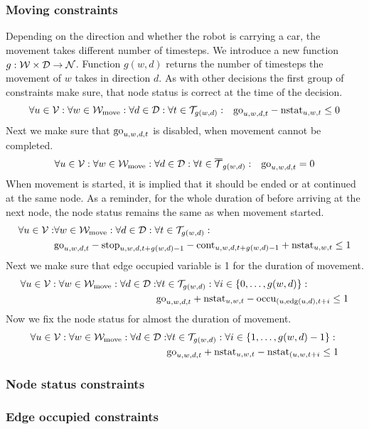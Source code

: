 \subsubsection{Moving constraints}
Depending on the direction and whether the robot is carrying a car, the
movement takes different number of timesteps. We introduce a new function $g:
\mathcal{W} \times \mathcal{D} \to \mathcal{N}$. Function $g(w,d)$ returns the number of timesteps
the movement of $w$ takes in direction $d$. As with other decisions the first
group of constraints make sure, that node status is correct at the time of the
decision.
\begin{align}
    &\forall u \in \mathcal{V}: \forall w \in \mathcal{W}_\mathrm{move}: \forall d \in \mathcal{D}: \forall t \in
    \mathcal{T}_{g(w,d)}:
    & \mathrm{go}_{u,w,d,t} - \mathrm{nstat}_{u,w,t} \leq 0
\end{align}
Next we make sure that $\mathrm{go}_{u,w,d,t}$ is disabled, when movement cannot be
completed.
\begin{align}
    &\forall u \in \mathcal{V}: \forall w \in \mathcal{W}_\mathrm{move}: \forall d \in \mathcal{D}: \forall t \in
    \overline{\mathcal{T}}_{g(w,d)}:
    & \mathrm{go}_{u,w,d,t} = 0
\end{align}
When movement is started, it is implied that it should be ended or at continued
at the same node. As a reminder, for the whole duration of before arriving at
the next node, the node status remains the same as when movement started.
\begin{equation}
    \begin{split}
        \forall u \in \mathcal{V}: &\forall w \in \mathcal{W}_\mathrm{move}: \forall d \in \mathcal{D}: \forall t \in
        \mathcal{T}_{g(w,d)}:\\
        & \mathrm{go}_{u,w,d,t} - \mathrm{stop}_{u,w,d,t+g(w,d)-1} - \mathrm{cont}_{u,w,d,t+g(w,d)-1} +
        \mathrm{nstat}_{u,w,t} \leq 1
    \end{split}
\end{equation}
Next we make sure that edge occupied variable is 1 for the duration of
movement.
\begin{equation}
    \begin{split}
        \forall u \in \mathcal{V}: \forall w \in \mathcal{W}_\mathrm{move}: \forall d \in \mathcal{D}: &\forall t \in
        \mathcal{T}_{g(w,d)}: \forall i \in \{0,\ldots,g(w,d)\}:\\
        & \mathrm{go}_{u,w,d,t} + \mathrm{nstat}_{u,w,t} -\mathrm{occu}_{(u,\mathrm{edg}(u,d),t+i} \leq 1
    \end{split}
\end{equation}
Now we fix the node status for almost the duration of movement.
\begin{equation}
    \begin{split}
        \forall u \in \mathcal{V}: \forall w \in \mathcal{W}_\mathrm{move}: \forall d \in \mathcal{D}: &\forall t \in
        \mathcal{T}_{g(w,d)}: \forall i \in \{1,\ldots,g(w,d)-1\}:\\
        & \mathrm{go}_{u,w,d,t} + \mathrm{nstat}_{u,w,t} -\mathrm{nstat}_{(u,w,t+i} \leq 1
    \end{split}
\end{equation}

\subsubsection{Node status constraints}
\subsubsection{Edge occupied constraints}
